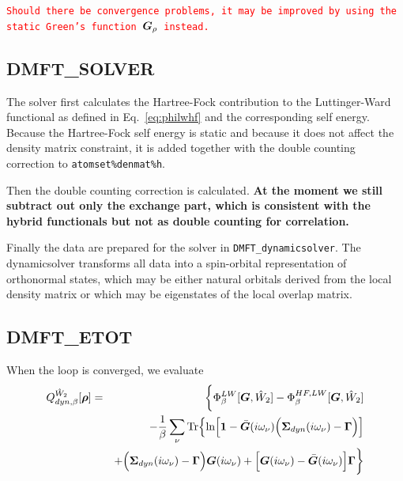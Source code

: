 \documentclass[11pt,a4paper]{report}
\newcommand{\petertt}[1]{\textcolor{red}{\texttt{#1}}}
\begin{document}
\petertt{Should
  there be convergence problems, it may be improved by using the
  static Green's function $\bm{G}_\rho$ instead.}




\subsection{DMFT\_SOLVER}
The solver first calculates the Hartree-Fock contribution to the
Luttinger-Ward functional as defined in Eq.~\ref{eq:philwhf} and the
corresponding self energy. Because the Hartree-Fock self energy is
static and because it does not affect the density matrix constraint,
it is added together with the double counting correction to
\verb|atomset%denmat%h|.


Then the double counting correction is calculated. \textbf{At the
  moment we still subtract out only the exchange part, which is
  consistent with the hybrid functionals but not as double counting
  for correlation.}

Finally the data are prepared for the solver in
\verb|DMFT_dynamicsolver|. The dynamicsolver transforms all data into
a spin-orbital representation of orthonormal states, which may be
either natural orbitals derived from the local density matrix or which
may be eigenstates of the local overlap matrix.

\subsection{DMFT\_ETOT}
When the loop is converged,  we evaluate 
\begin{eqnarray}
Q^{\hat{W}_2}_{dyn,\beta}[\bm{\rho}]
&=&
\biggl\lbrace
\Phi^{LW}_\beta[\bm{G},\hat{W}_2]-\Phi^{HF,LW}_\beta[\bm{G},\hat{W}_2]
\nonumber\\
&&-\frac{1}{\beta}\sum_\nu\mathrm{Tr}\Bigl\lbrace
\ln\Bigl[
\bm{1}-
\bar{\bm{G}}(i\omega_\nu)
\Bigl(\bm{\Sigma}_{dyn}(i\omega_\nu)-\bm{\Gamma}\Bigr)
\Bigr]
\nonumber\\&&
+\Bigl(\bm{\Sigma}_{dyn}(i\omega_\nu)-\bm{\Gamma}\Bigr)\bm{G}(i\omega_\nu)
+
\Bigl[\bm{G}(i\omega_\nu)-\bar{\bm{G}}(i\omega_\nu)\Bigr]
\bm{\Gamma}
\biggr\rbrace
\nonumber\\
\label{eq:dmf1greenenergy}
\end{eqnarray}
\end{document}
